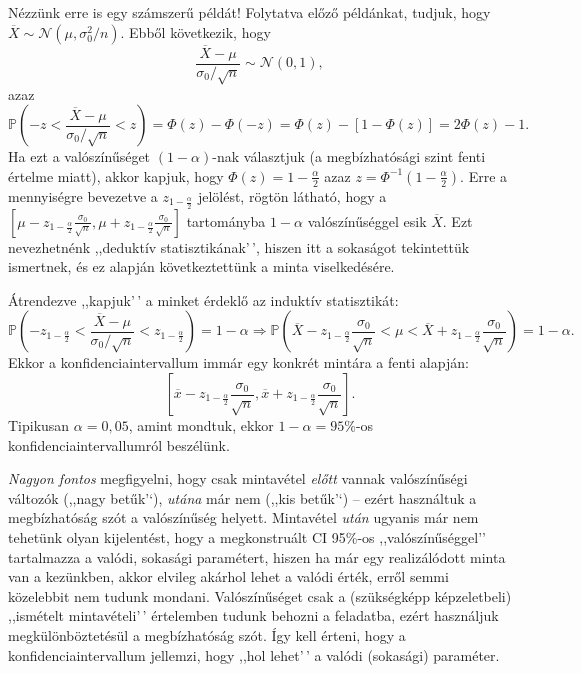 \documentclass[
]{book}
\begin{document}
Nézzünk erre is egy számszerű példát! Folytatva előző példánkat, tudjuk, hogy \(\overline{X} \sim \mathcal{N}\left(\mu,\sigma_0^2/n\right)\). Ebből következik, hogy
\[
    \frac{\overline{X}-\mu}{\sigma_0/\sqrt{n}}\sim\mathcal{N}\left(0,1\right),
\]
azaz
\[
    \mathbb{P}\left(-z<\frac{\overline{X}-\mu}{\sigma_0/\sqrt{n}}<z\right)=\Phi\left(z\right)-\Phi\left(-z\right)=\Phi\left(z\right)-\left[1-\Phi\left(z\right)\right]=2\Phi\left(z\right)-1.
\]
Ha ezt a valószínűséget \(\left(1-\alpha\right)\)-nak választjuk (a megbízhatósági szint fenti értelme miatt), akkor kapjuk, hogy \(\Phi\left(z\right)=1-\frac{\alpha}{2}\) azaz \(z=\Phi^{-1}\left(1-\frac{\alpha}{2}\right)\). Erre a mennyiségre bevezetve a \(z_{1-\frac{\alpha}{2}}\) jelölést, rögtön látható, hogy a \(\left[\mu-z_{1-\frac{\alpha}{2}}\frac{\sigma_0}{\sqrt{n}},\mu+z_{1-\frac{\alpha}{2}}\frac{\sigma_0}{\sqrt{n}}\right]\) tartományba \(1-\alpha\) valószínűséggel esik \(\overline{X}\). Ezt nevezhetnénk ,,deduktív statisztikának'\,', hiszen itt a sokaságot tekintettük ismertnek, és ez alapján következtettünk a minta viselkedésére.

Átrendezve ,,kapjuk'\,' a minket érdeklő az induktív statisztikát:
\[
    \mathbb{P}\left(-z_{1-\frac{\alpha}{2}}<\frac{\overline{X}-\mu}{\sigma_0/\sqrt{n}}<z_{1-\frac{\alpha}{2}}\right)=1-\alpha \Rightarrow \mathbb{P}\left(\overline{X}-z_{1-\frac{\alpha}{2}}\frac{\sigma_0}{\sqrt{n}}<\mu<\overline{X}+z_{1-\frac{\alpha}{2}}\frac{\sigma_0}{\sqrt{n}}\right)=1-\alpha.
\]
Ekkor a konfidenciaintervallum immár egy konkrét mintára a fenti alapján:
\[
    \left[\overline{x}-z_{1-\frac{\alpha}{2}}\frac{\sigma_0}{\sqrt{n}},\overline{x}+z_{1-\frac{\alpha}{2}}\frac{\sigma_0}{\sqrt{n}}\right].
\]
Tipikusan \(\alpha=0,\!05\), amint mondtuk, ekkor \(1-\alpha=95\)\%-os konfidenciaintervallumról beszélünk.

\emph{Nagyon fontos} megfigyelni, hogy csak mintavétel \emph{előtt} vannak valószínűségi változók (,,nagy betűk'`), \emph{utána} már nem (,,kis betűk'`) -- ezért használtuk a megbízhatóság szót a valószínűség helyett. Mintavétel \emph{után} ugyanis már nem tehetünk olyan kijelentést, hogy a megkonstruált CI 95\%-os ,,valószínűséggel'' tartalmazza a valódi, sokasági paramétert, hiszen ha már egy realizálódott minta van a kezünkben, akkor elvileg akárhol lehet a valódi érték, erről semmi közelebbit nem tudunk mondani. Valószínűséget csak a (szükségképp képzeletbeli) ,,ismételt mintavételi'\,' értelemben tudunk behozni a feladatba, ezért használjuk megkülönböztetésül a megbízhatóság szót. Így kell érteni, hogy a konfidenciaintervallum jellemzi, hogy ,,hol lehet'\,' a valódi (sokasági) paraméter.
\end{document}
